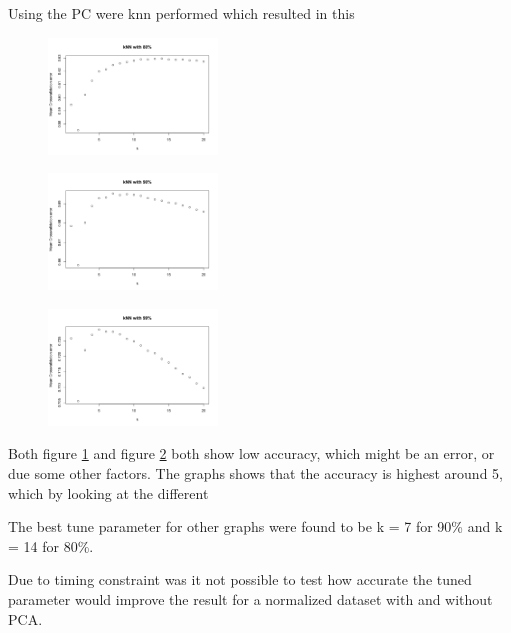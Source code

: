 Using the PC were knn performed which resulted in this

\begin{figure}[H]
\centering
\includegraphics[width = 0.4\textwidth]{graphics/kNN_plot_80.png}
\label{fig:knnFit_80}
\caption{}
\end{figure}


\begin{figure}[H]
\centering
\includegraphics[width = 0.4\textwidth]{graphics/kNN_plot_90.png}
\label{fig:knnFit_90}
\caption{}
\end{figure}


\begin{figure}[H]
\centering
\includegraphics[width = 0.4\textwidth]{graphics/kNN_plot_99.png}
\label{fig:knnFit_99}
\caption{}
\end{figure}

Both figure \ref{fig:knnFit_80} and figure \ref{fig:knnFit_90} both show low accuracy,
which might be an error, or due some other factors. 
 The graphs shows that the accuracy is highest around 5, which by looking at the different

The best tune parameter for other graphs were found to be k = 7 for 90\% and k = 14 for 80\%.


Due to timing constraint was it not possible to test how accurate the tuned parameter would improve the result for a normalized dataset with and without PCA. 